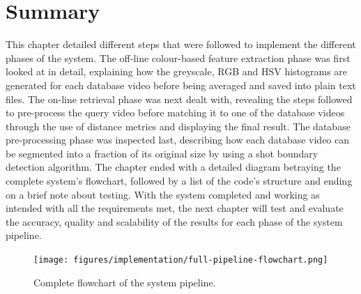
\section{Summary}

This chapter detailed different steps that were followed to implement the different phases of the system. The off-line colour-based feature extraction phase was first looked at in detail, explaining how the greyscale, RGB and HSV histograms are generated for each database video before being averaged and saved into plain text files. The on-line retrieval phase was next dealt with, revealing the steps followed to pre-process the query video before matching it to one of the database videos through the use of distance metrics and displaying the final result. The database pre-processing phase was inspected last, describing how each database video can be segmented into a fraction of its original size by using a shot boundary detection algorithm. The chapter ended with a detailed diagram betraying the complete system's flowchart, followed by a list of the code's structure and ending on a brief note about testing. With the system completed and working as intended with all the requirements met, the next chapter will test and evaluate the accuracy, quality and scalability of the results for each phase of the system pipeline. 

\begin{figure}[h] 
\centerline{\texttt{[image: figures/implementation/full-pipeline-flowchart.png]}}
\caption{\label{fig:CBVR-flowchart}Complete flowchart of the system pipeline.}
\end{figure}